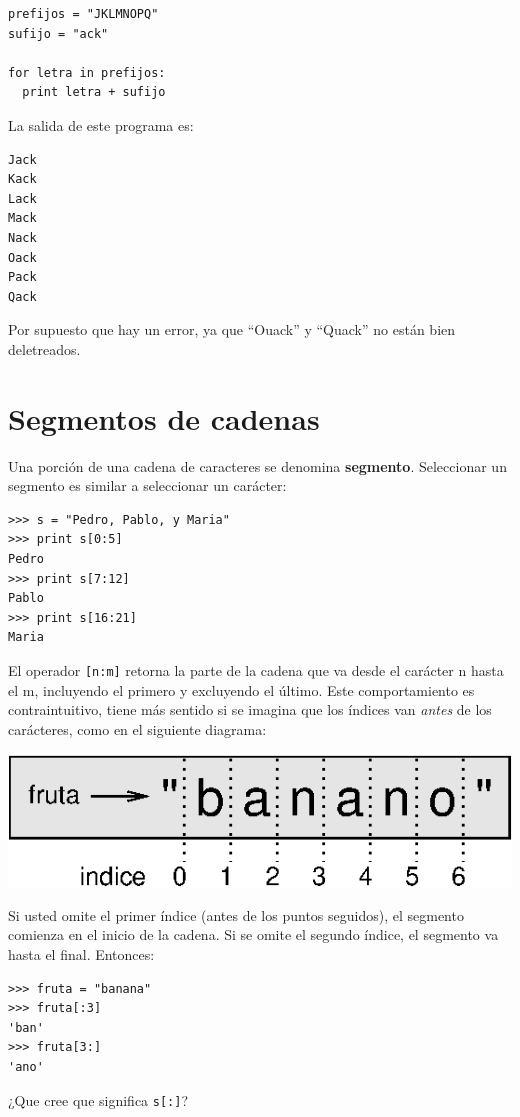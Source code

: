 \beforeverb
\begin{verbatim}
prefijos = "JKLMNOPQ"
sufijo = "ack"

for letra in prefijos:
  print letra + sufijo
\end{verbatim}
\afterverb
%
La salida de este programa es:

\beforeverb
\begin{verbatim}
Jack
Kack
Lack
Mack
Nack
Oack
Pack
Qack
\end{verbatim}
\afterverb
%
Por supuesto que hay un error, ya que ``Ouack'' y
``Quack'' no están bien deletreados.


\section{Segmentos de cadenas }
\label{slice}

Una porción de una cadena de caracteres se denomina {\bf segmento}.  
Seleccionar un segmento es similar a seleccionar un carácter:

\beforeverb
\begin{verbatim}
>>> s = "Pedro, Pablo, y Maria"
>>> print s[0:5]
Pedro
>>> print s[7:12]
Pablo
>>> print s[16:21]
Maria
\end{verbatim}
\afterverb
%
El operador \texttt{[n:m]} retorna la parte de la cadena
que va desde el carácter n hasta el m, incluyendo el 
primero y excluyendo el último. Este comportamiento
es contraintuitivo, tiene más sentido si se imagina
que los índices van {\em antes} de los
carácteres, como en el siguiente diagrama:

\beforefig
\centerline{\includegraphics{illustrations/banana.eps}}
\afterfig

Si usted omite el primer índice (antes de los puntos seguidos), el
segmento comienza en el inicio de la cadena. Si se omite el segundo
índice, el segmento va hasta el final. Entonces:

\beforeverb
\begin{verbatim}
>>> fruta = "banana"
>>> fruta[:3]
'ban'
>>> fruta[3:]
'ano'
\end{verbatim}
\afterverb
%
¿Que cree que significa \texttt{s[:]}?


